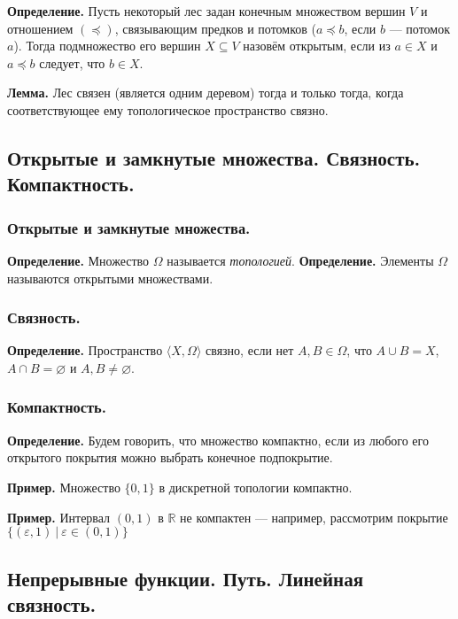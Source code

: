 \documentclass[10pt,a4paper,oneside]{article}
\begin{document}
\noindent \textbf{ Определение. } Пусть некоторый лес задан конечным множеством вершин $V$ и
отношением $(\preceq)$, связывающим предков и потомков ($a \preceq b$, если $b$ --- потомок $a$). Тогда подмножество его вершин $X\subseteq V$ назовём открытым, 
если из $a \in X$ и $a \preceq b$ следует, что $b \in X$.

\noindent \textbf{ Лемма. } Лес связен (является одним деревом) тогда и только тогда, когда соответствующее ему 
топологическое пространство связно.

\subsection{Открытые и замкнутые множества. Связность. Компактность. }

\subsubsection{Открытые и замкнутые множества.}

\noindent \textbf{ Определение. } Множество $\Omega$ называется \emph{топологией}.
\noindent \textbf{ Определение. } Элементы $\Omega$ называются открытыми множествами.

\subsubsection{Связность.}

\noindent \textbf{ Определение. } Пространство $\langle X, \Omega\rangle$ связно, если нет $A,B \in \Omega$, что $A\cup B = X$,
$A \cap B = \varnothing$ и $A,B \ne \varnothing$.

\subsubsection{Компактность.}

\noindent \textbf{ Определение. } Будем говорить, что множество компактно, если из любого его открытого покрытия можно выбрать конечное
подпокрытие.

\noindent \textbf{ Пример. } Множество $\{0,1\}$ в дискретной топологии компактно.


\noindent \textbf{ Пример. } Интервал $(0,1)$ в $\mathbb{R}$ не компактен --- например, рассмотрим покрытие $\{(\varepsilon,1)\ |\ \varepsilon\in(0,1)\}$ 

\subsection{Непрерывные функции. Путь. Линейная связность. }
\end{document}
